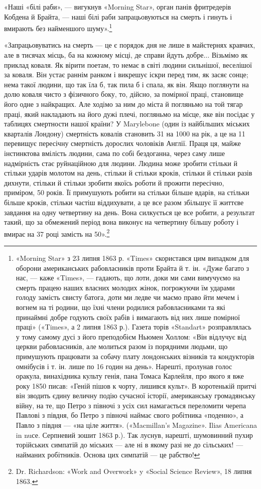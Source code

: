 «Наші «білі раби», — вигукнув «Morning Star», орган панів
фритредерів Кобдена й Брайта, — наші білі раби запрацьовуються
на смерть і гинуть і вмирають без найменшого шуму».\footnote{
«Morning Star» з 23 липня 1863 р. «Times» скористався цим випадком
для оборони американських рабовласників проти Брайта й т. ін.
«Дуже багато з нас, — каже «Times», — гадають, що лоти, доки ми сами
вимучуємо на смерть працею наших власних молодих жінок, погрожуючи
їм ударами голоду замість свисту батога, доти ми ледве чи маємо право
йти мечем і вогнем на ті родини, що їхні члени родилися рабовласниками
та які принаймні добре годують своїх рабів і вимагають від них лише
помірної праці» («Times», а 2 липня 1863 р.). Газета торів «Standart»
розправлялась у тому самому дусі з його преподобієм Ньюмен Холлом:
«Він відлучує від церкви рабовласників, але молиться разом із порядними
людьми, що примушують працювати за собачу плату лондонських візників
та кондукторів омнібусів і т. ін. лише по 16 годин на день». Нарешті,
пролунав голос оракула, винахідника культу генія, пана Томаса Карлейля,
про якого я вже року 1850 писав: «Геній пішов к чорту, лишився культ».
В коротенькій притчі він зводить єдину величну подію сучасної історії,
американську громадянську війну, на те, що Петро з півночі з усіх сил
намагається переломити черепа Павлові з півдня, бо Петро з півночі
наймає свого робітника «поденно», а Павло з півдня — «на ціле життя».
(«Macmillan’s Magazine». Ilias Americana in nuсе. Серпневий зошит
1863 р.). Так луснув, нарешті, шумовинний пухир торійських симпатій
до міських — але ні в якому разі не до сільських! — найманих робітників.
Основа цих симпатій — це рабство!
}

«Запрацьовуватись на смерть — це є порядок дня не лише
в майстернях кравчих, але в тисячах місць, ба на кожному місці,
де справи йдуть добре... Візьмімо як приклад коваля. Як вірити
поетам, то немає в світі людини сильнішої, веселішої за коваля.
Він устає раннім ранком і викрешує іскри перед тим, як засяє
сонце; нема такої людини, що так їла б, так пила б і спала, як
він. Якщо поглянути на долю коваля чисто з фізичного боку, то,
дійсно, за помірної праці, становище його одне з найкращих.
Але ходімо за ним до міста й погляньмо на той тягар праці, який
накладають на його дужі плечі, погляньмо на місце, яке він посідає
у таблицях смертности нашої країни? У Marylebone (один із
найбільших міських кварталів Лондону) смертність ковалів становить
31 на 1000 на рік, а це на 11 перевищує пересічну смертність
дорослих чоловіків Англії. Праця ця, майже інстинктова вмілість
людини, сама по собі бездоганна, через саму лише надмірність
стає руйнаційною для людини. Людина може зробити стільки й
стільки ударів молотом на день, стільки й стільки кроків, стільки
й стільки разів дихнути, стільки й стільки зробити якоїсь роботи
й прожити пересічно, приміром, 50 років. Її примушують робити
на стільки більше вдарів, на стільки більше кроків, стільки частіш
віддихувати, а це все разом збільшує її життєве завдання на
одну четвертину на день. Вона силкується це все робити, а результат
такий, що за обмежений період вона виконує на четвертину
більшу роботу і вмирає на 37 році замість на 50».\footnote{
Dr. Richardson: «Work and Overwork» y «Social Science Review»,
18 липня 1863.
}